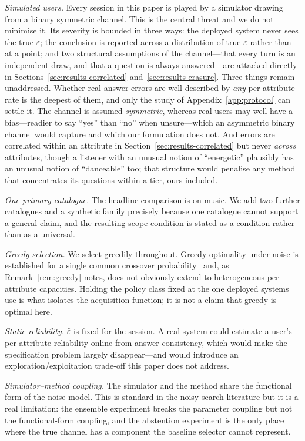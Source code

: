 \emph{Simulated users.} Every session in this paper is played by a simulator
drawing from a binary symmetric channel. This is the central threat and we do
not minimise it. Its severity is bounded in three ways: the deployed system
never sees the true $\varepsilon$; the conclusion is reported across a
distribution of true $\varepsilon$ rather than at a point; and two structural
assumptions of the channel---that every turn is an independent draw, and that a
question is always answered---are attacked directly in
Sections~\ref{sec:results-correlated} and~\ref{sec:results-erasure}. Three
things remain unaddressed. Whether real answer errors are well described by
\emph{any} per-attribute rate is the deepest of them, and only the study of
Appendix~\ref{app:protocol} can settle it. The channel is assumed
\emph{symmetric}, whereas real users may well have a bias---readier to say
``yes'' than ``no'' when unsure---which an asymmetric binary channel would
capture and which our formulation does not. And errors are correlated within an
attribute in Section~\ref{sec:results-correlated} but never \emph{across}
attributes, though a listener with an unusual notion of ``energetic'' plausibly
has an unusual notion of ``danceable'' too; that structure would penalise any
method that concentrates its questions within a tier, ours included.

\emph{One primary catalogue.} The headline comparison is on music. We add two
further catalogues and a synthetic family precisely because one catalogue
cannot support a general claim, and the resulting scope condition is stated as
a condition rather than as a universal.

\emph{Greedy selection.} We select greedily throughout. Greedy optimality under
noise is established for a single common crossover probability~\cite{jedynak2012}
and, as Remark~\ref{rem:greedy} notes, does not obviously extend to
heterogeneous per-attribute capacities. Holding the policy class fixed at the
one deployed systems use is what isolates the acquisition function; it is not a
claim that greedy is optimal here.

\emph{Static reliability.} $\hat\varepsilon$ is fixed for the session. A real
system could estimate a user's per-attribute reliability online from answer
consistency, which would make the specification problem largely disappear---and
would introduce an exploration/exploitation trade-off this paper does not
address.

\emph{Simulator--method coupling.} The simulator and the method share the
functional form of the noise model. This is standard in the noisy-search
literature but it is a real limitation: the ensemble experiment breaks the
parameter coupling but not the functional-form coupling, and the abstention
experiment is the only place where the true channel has a component the
baseline selector cannot represent.

